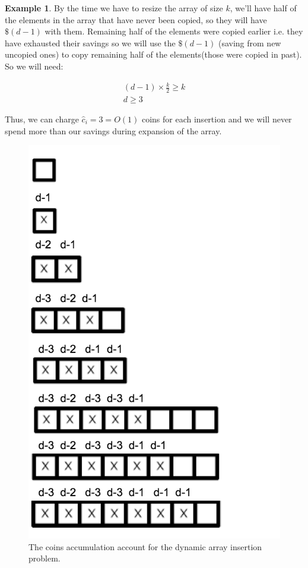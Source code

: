\documentclass[11pt]{article}
\theoremstyle{definition}
\newtheorem{exmp}{Example}[section]
\begin{document}
\begin{exmp}
By the time we have to resize the array of size $k$, we'll have half of the elements in the array that have never been copied, so they will have $\$(d-1)$ with them. Remaining half of the elements were copied earlier i.e. they have exhausted their savings so we will use the $\$(d-1)$ (saving from new uncopied ones) to copy remaining half of the elements(those were copied in past). So we will need:

\begin{eqnarray*}
(d-1) \times \frac{k}{2} \ge k \\
d \ge 3
\end{eqnarray*}

Thus, we can charge $\hat{c}_i = 3 = O(1)$ coins for each insertion and we will never spend more than our savings during expansion of the array.

\begin{figure}[tbh]
\centering
\includegraphics[scale=0.5]{figures/dynamicaccounting}
\caption{The coins accumulation account for the dynamic array insertion problem.}
\label{fig:dynamicaccounting}
\end{figure}
\end{exmp}
\end{document}
